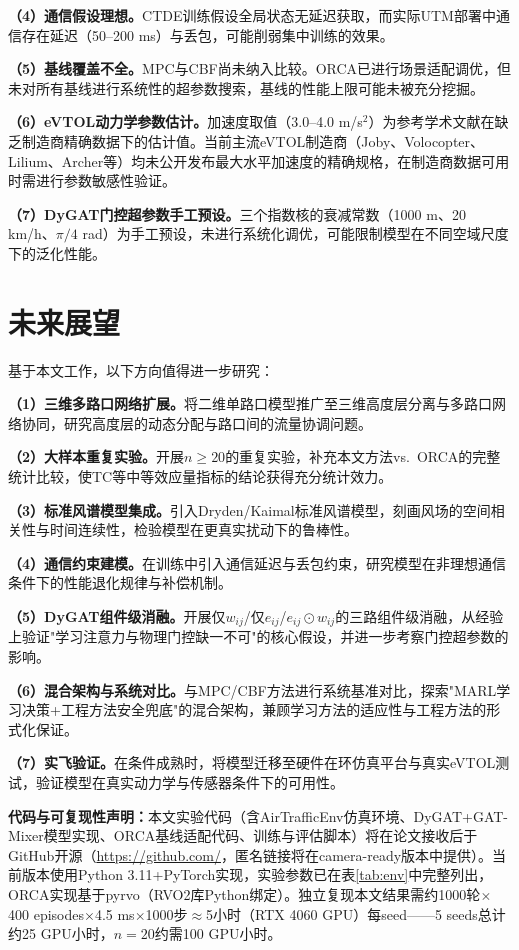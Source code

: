 \documentclass[12pt,a4paper,UTF8]{ctexbook}
\begin{document}
\textbf{（4）通信假设理想。}CTDE训练假设全局状态无延迟获取，而实际UTM部署中通信存在延迟（50--200 ms）与丢包，可能削弱集中训练的效果。

\textbf{（5）基线覆盖不全。}MPC与CBF尚未纳入比较。ORCA已进行场景适配调优，但未对所有基线进行系统性的超参数搜索，基线的性能上限可能未被充分挖掘。

\textbf{（6）eVTOL动力学参数估计。}加速度取值（3.0--4.0 m/s$^2$）为参考学术文献\cite{ref25}在缺乏制造商精确数据下的估计值。当前主流eVTOL制造商（Joby、Volocopter、Lilium、Archer等）均未公开发布最大水平加速度的精确规格，在制造商数据可用时需进行参数敏感性验证。

\textbf{（7）DyGAT门控超参数手工预设。}三个指数核的衰减常数（1000 m、20 km/h、$\pi/4$ rad）为手工预设，未进行系统化调优，可能限制模型在不同空域尺度下的泛化性能。

\section{未来展望}

基于本文工作，以下方向值得进一步研究：

\textbf{（1）三维多路口网络扩展。}将二维单路口模型推广至三维高度层分离与多路口网络协同，研究高度层的动态分配与路口间的流量协调问题。

\textbf{（2）大样本重复实验。}开展$n\geq20$的重复实验，补充本文方法vs.\ ORCA的完整统计比较，使TC等中等效应量指标的结论获得充分统计效力。

\textbf{（3）标准风谱模型集成。}引入Dryden/Kaimal标准风谱模型，刻画风场的空间相关性与时间连续性，检验模型在更真实扰动下的鲁棒性。

\textbf{（4）通信约束建模。}在训练中引入通信延迟与丢包约束，研究模型在非理想通信条件下的性能退化规律与补偿机制。

\textbf{（5）DyGAT组件级消融。}开展仅$w_{ij}$/仅$e_{ij}$/$e_{ij}\odot w_{ij}$的三路组件级消融，从经验上验证"学习注意力与物理门控缺一不可"的核心假设，并进一步考察门控超参数的影响。

\textbf{（6）混合架构与系统对比。}与MPC/CBF方法进行系统基准对比，探索"MARL学习决策+工程方法安全兜底"的混合架构，兼顾学习方法的适应性与工程方法的形式化保证。

\textbf{（7）实飞验证。}在条件成熟时，将模型迁移至硬件在环仿真平台与真实eVTOL测试，验证模型在真实动力学与传感器条件下的可用性。

\textbf{代码与可复现性声明：}本文实验代码（含AirTrafficEnv仿真环境、DyGAT+GAT-Mixer模型实现、ORCA基线适配代码、训练与评估脚本）将在论文接收后于GitHub开源（\url{https://github.com/}，匿名链接将在camera-ready版本中提供）。当前版本使用Python 3.11+PyTorch实现，实验参数已在表\ref{tab:env}中完整列出，ORCA实现基于pyrvo（RVO2库Python绑定）。独立复现本文结果需约1000轮$\times$400 episodes$\times$4.5 ms$\times$1000步$\approx$5小时（RTX 4060 GPU）每seed——5 seeds总计约25 GPU小时，$n=20$约需100 GPU小时。
\end{document}
